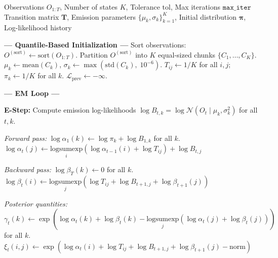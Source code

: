 \begin{algorithm}[tp]
\caption{Baum-Welch (EM) algorithm for continuous Gaussian HMM parameter estimation}
\label{alg:baum_welch}
\small
\begin{algorithmic}[1]
\REQUIRE Observations $O_{1:T}$, Number of states $K$, Tolerance $\text{tol}$, Max iterations $\texttt{max\_iter}$
\ENSURE Transition matrix $\mathbf{T}$, Emission parameters $\{\mu_k, \sigma_k\}_{k=1}^K$, Initial distribution $\boldsymbol{\pi}$, Log-likelihood history

\STATE \textbf{--- Quantile-Based Initialization ---}
\STATE Sort observations: $O^{(\text{sort})} \leftarrow \text{sort}(O_{1:T})$.
\STATE Partition $O^{(\text{sort})}$ into $K$ equal-sized chunks $\{C_1, \ldots, C_K\}$.
    \STATE $\mu_k \leftarrow \text{mean}(C_k)$, \quad $\sigma_k \leftarrow \max(\text{std}(C_k),\; 10^{-6})$.
\ENDFOR
\STATE $T_{ij} \leftarrow 1/K$ for all $i, j$; \quad $\pi_k \leftarrow 1/K$ for all $k$.
\STATE $\mathcal{L}_{\text{prev}} \leftarrow -\infty$.

\STATE \textbf{--- EM Loop ---}

    \STATE \textbf{E-Step:} Compute emission log-likelihoods $\log B_{t,k} = \log \mathcal{N}(O_t \mid \mu_k, \sigma_k^2)$ for all $t, k$.

    \STATE \textit{Forward pass:}
    \STATE $\log \alpha_1(k) \leftarrow \log \pi_k + \log B_{1,k}$ for all $k$.
            \STATE $\log \alpha_t(j) \leftarrow \underset{i}{\text{logsumexp}}\!\left(\log \alpha_{t-1}(i) + \log T_{ij}\right) + \log B_{t,j}$
        \ENDFOR
    \ENDFOR

    \STATE \textit{Backward pass:}
    \STATE $\log \beta_T(k) \leftarrow 0$ for all $k$.
            \STATE $\log \beta_t(i) \leftarrow \underset{j}{\text{logsumexp}}\!\left(\log T_{ij} + \log B_{t+1,j} + \log \beta_{t+1}(j)\right)$
        \ENDFOR
    \ENDFOR

    \STATE \textit{Posterior quantities:}
        \STATE $\gamma_t(k) \leftarrow \exp\!\left(\log \alpha_t(k) + \log \beta_t(k) - \underset{j}{\text{logsumexp}}(\log \alpha_t(j) + \log \beta_t(j))\right)$ for all $k$.
    \ENDFOR
                \STATE $\xi_t(i,j) \leftarrow \exp\!\left(\log \alpha_t(i) + \log T_{ij} + \log B_{t+1,j} + \log \beta_{t+1}(j) - \text{norm}\right)$
            \ENDFOR
        \ENDFOR
    \ENDFOR


\end{algorithmic}
\end{algorithm}
